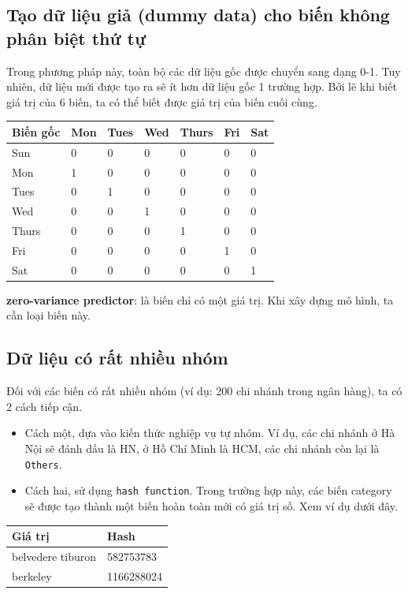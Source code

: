 \documentclass[]{krantz}
\providecommand{\tightlist}{%
  \setlength{\itemsep}{0pt}\setlength{\parskip}{0pt}}
\theoremstyle{definition}
\theoremstyle{definition}
\theoremstyle{definition}
\theoremstyle{remark}
\begin{document}
\hypertarget{tao-d-liu-gia-dummy-data-cho-bin-khong-phan-bit-th-t}{%
\subsection{Tạo dữ liệu giả (dummy data) cho biến không phân biệt thứ
tự}\label{tao-d-liu-gia-dummy-data-cho-bin-khong-phan-bit-th-t}}

Trong phương pháp này, toàn bộ các dữ liệu gốc được chuyển sang dạng
0-1. Tuy nhiên, dữ liệu mới được tạo ra sẽ ít hơn dữ liệu gốc 1 trường
hợp. Bởi lẽ khi biết giá trị của 6 biến, ta có thể biết được giá trị của
biến cuối cùng.

\begin{longtable}[]{@{}lllllll@{}}
\toprule
Biến gốc & Mon & Tues & Wed & Thurs & Fri & Sat\tabularnewline
\midrule
\endhead
Sun & 0 & 0 & 0 & 0 & 0 & 0\tabularnewline
Mon & 1 & 0 & 0 & 0 & 0 & 0\tabularnewline
Tues & 0 & 1 & 0 & 0 & 0 & 0\tabularnewline
Wed & 0 & 0 & 1 & 0 & 0 & 0\tabularnewline
Thurs & 0 & 0 & 0 & 1 & 0 & 0\tabularnewline
Fri & 0 & 0 & 0 & 0 & 1 & 0\tabularnewline
Sat & 0 & 0 & 0 & 0 & 0 & 1\tabularnewline
\bottomrule
\end{longtable}

\textbf{zero-variance predictor}: là biến chỉ có một giá trị. Khi xây
dựng mô hình, ta cần loại biến này.

\hypertarget{d-liu-co-rt-nhiu-nhom}{%
\subsection{Dữ liệu có rất nhiều nhóm}\label{d-liu-co-rt-nhiu-nhom}}

Đối với các biến có rất nhiều nhóm (ví dụ: 200 chi nhánh trong ngân
hàng), ta có 2 cách tiếp cận.

\begin{itemize}
\tightlist
\item
  Cách một, dựa vào kiến thức nghiệp vụ tự nhóm. Ví dụ, các chi nhánh ở
  Hà Nội sẽ đánh dấu là HN, ở Hồ Chí Minh là HCM, các chi nhánh còn lại
  là \texttt{Others}.
\item
  Cách hai, sử dụng \texttt{hash\ function}. Trong trường hợp này, các
  biến category sẽ được tạo thành một biến hoàn toàn mới có giá trị số.
  Xem ví dụ dưới đây.
\end{itemize}

\begin{longtable}[]{@{}ll@{}}
\toprule
Giá trị & Hash\tabularnewline
\midrule
\endhead
belvedere tiburon & 582753783\tabularnewline
berkeley & 1166288024\tabularnewline
\bottomrule
\end{longtable}
\end{document}
